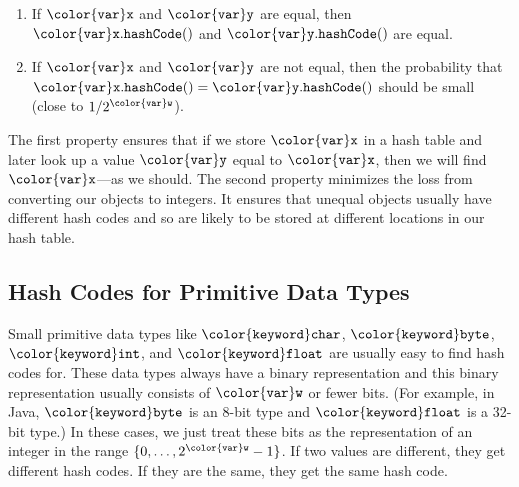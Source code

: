 \documentclass[10pt]{book}
\newcommand{\cpponly}[1]{}\newcommand{\javaonly}[1]{#1}\newcommand{\pcodeonly}[1]{}\newcommand{\notpcode}[1]{#1}\newcommand{\lang}{Java}
\theoremstyle{plain}
\theoremstyle{definition}
\begin{document}
\begin{enumerate}
  \item If \ensuremath{\mathtt{{\color{var}x}}} and \ensuremath{\mathtt{{\color{var}y}}} are equal, then \ensuremath{\mathtt{{\color{var}x}.hashCode()}} and \ensuremath{\mathtt{{\color{var}y}.hashCode()}}
  are equal.

  \item If \ensuremath{\mathtt{{\color{var}x}}} and \ensuremath{\mathtt{{\color{var}y}}} are not equal, then the probability that
  $\ensuremath{\mathtt{{\color{var}x}.hashCode()}}=\ensuremath{\mathtt{{\color{var}y}.hashCode()}}$ should be small (close to
  $1/2^{\ensuremath{\mathtt{{\color{var}w}}}}$).
\end{enumerate}

The first property ensures that if we store \ensuremath{\mathtt{{\color{var}x}}} in a hash table and later
look up a value \ensuremath{\mathtt{{\color{var}y}}} equal to \ensuremath{\mathtt{{\color{var}x}}}, then we will find \ensuremath{\mathtt{{\color{var}x}}}---as we should.
The second property minimizes the loss from converting our objects
to integers.  It ensures that unequal objects usually have different
hash codes and so are likely to be stored at different locations in
our hash table.

\subsection{Hash Codes for Primitive Data Types}

%
Small primitive data types like \ensuremath{\mathtt{{\color{keyword}char}}}, \ensuremath{\mathtt{{\color{keyword}byte}}}, \ensuremath{\mathtt{{\color{keyword}int}}}, and \ensuremath{\mathtt{{\color{keyword}float}}} are
usually easy to find hash codes for.  These data types always have a
binary representation and this binary representation usually consists of
\ensuremath{\mathtt{{\color{var}w}}} or fewer bits. \javaonly{(For example, in Java, \ensuremath{\mathtt{{\color{keyword}byte}}} is an 8-bit
type and \ensuremath{\mathtt{{\color{keyword}float}}} is a 32-bit type.)}\cpponly{(For example, in C++ \ensuremath{\mathtt{{\color{keyword}char}}}
is typically an 8-bit type and \ensuremath{\mathtt{{\color{keyword}float}}} is a 32-bit type.)} In these
cases, we just treat these bits as the representation of an integer in
the range $\{0,\ldots,2^\ensuremath{\mathtt{{\color{var}w}}}-1\}$.  If two values are different, they get
different hash codes.  If they are the same, they get the same hash code.
\end{document}
